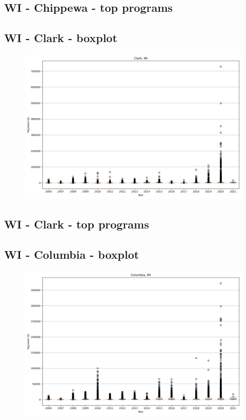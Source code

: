 \subsection*{WI - Chippewa - top programs}

\newpage
\subsection*{WI - Clark - boxplot}
\begin{figure}[h]
\centering
\includegraphics[width=7in]{../output/boxplots/counties/Clark-WI_boxplot.png}
\end{figure}


\subsection*{WI - Clark - top programs}

\newpage
\subsection*{WI - Columbia - boxplot}
\begin{figure}[h]
\centering
\includegraphics[width=7in]{../output/boxplots/counties/Columbia-WI_boxplot.png}
\end{figure}


